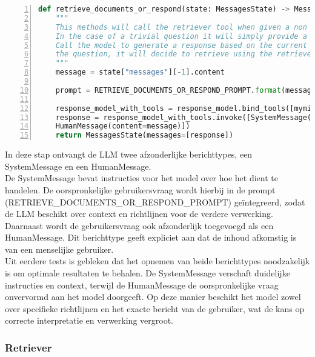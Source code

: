 \begin{lstlisting}[basicstyle=\small, frame=single, breaklines=true, postbreak=\mbox{\textcolor{red}{$\hookrightarrow$}\space}, escapeinside ={\%,}, escapechar={!}, numbers=left, language=Python, caption=Functie die beslist tussen direct antwoord en documentopvraging]
def retrieve_documents_or_respond(state: MessagesState) -> MessagesState:
    """
    This methods will call the retriever tool when given a non trivial question is asked.
    In the case of a trivial question it will simply provide a response
    Call the model to generate a response based on the current state. Given
    the question, it will decide to retrieve using the retriever tool, or simply respond to the user.
    """
    message = state["messages"][-1].content
    
    prompt = RETRIEVE_DOCUMENTS_OR_RESPOND_PROMPT.format(message=message)
    
    response_model_with_tools = response_model.bind_tools([myminfin_retriever_tool])
    response = response_model_with_tools.invoke([SystemMessage(content=prompt),
    HumanMessage(content=message)])
    return MessagesState(messages=[response])
\end{lstlisting}

In deze stap ontvangt de LLM twee afzonderlijke berichttypes, een SystemMessage en een HumanMessage.
\\[1em]
De SystemMessage bevat instructies voor het model over hoe het dient te handelen. De oorspronkelijke gebruikersvraag wordt hierbij in de prompt (RETRIEVE\_DOCUMENTS\_OR\_RESPOND\_PROMPT) geïntegreerd, zodat de LLM beschikt over context en richtlijnen voor de verdere verwerking.
\\[1em]
Daarnaast wordt de gebruikersvraag ook afzonderlijk toegevoegd als een HumanMessage. Dit berichttype geeft expliciet aan dat de inhoud afkomstig is van een menselijke gebruiker.
\\[1em]
Uit eerdere tests is gebleken dat het opnemen van beide berichttypes noodzakelijk is om optimale resultaten te behalen. De SystemMessage verschaft duidelijke instructies en context, terwijl de HumanMessage de oorspronkelijke vraag onvervormd aan het model doorgeeft. Op deze manier beschikt het model zowel over specifieke richtlijnen en het exacte bericht van de gebruiker, wat de kans op correcte interpretatie en verwerking vergroot.

\subsubsection{Retriever}

